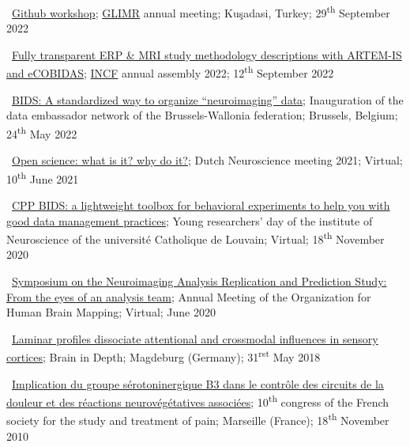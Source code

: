 \textbullet~\href{https://docs.google.com/presentation/d/1508GI_iLxyRwzJtWmnSQuSnfuGEUCaVXHguu8FRA4dI/}{Github workshop};
\href{https://glimr.eu/}{GLIMR} annual meeting;
Kuşadasi, Turkey;
29\textsuperscript{th} September 2022

\textbullet~\href{https://docs.google.com/presentation/d/1z1aixJTiUl6plDOPEIobntSKUgspVaN6Doby5EDMubI/}
{Fully transparent ERP & MRI study methodology descriptions with ARTEM-IS and eCOBIDAS};
\href{https://www.incf.org}{INCF} annual assembly 2022;
12\textsuperscript{th} September 2022

\textbullet~\href{https://osf.io/h7gcm}{BIDS: A standardized way to organize “neuroimaging” data};
Inauguration of the data embassador network of the Brussels-Wallonia federation;
Brussels, Belgium;
24\textsuperscript{th} May 2022

\textbullet~\href{https://osf.io/ce7tn/}{Open science: what is it? why do it?};
Dutch Neuroscience meeting 2021;
Virtual;
10\textsuperscript{th} June 2021

\textbullet~\href{https://osf.io/y7cjn/}{CPP BIDS: a lightweight toolbox for behavioral experiments to help you with good data management practices};
Young researchers' day of the institute of Neuroscience of the université Catholique de Louvain;
Virtual;
18\textsuperscript{th} November 2020

\textbullet~\href{https://osf.io/b8p9e/}{Symposium on the Neuroimaging Analysis
Replication and Prediction Study: From the eyes of an analysis team};
Annual Meeting of the Organization for Human Brain Mapping;
Virtual;
June 2020

\textbullet~\href{https://osf.io/b8p9e/}{Laminar profiles dissociate attentional and crossmodal influences in sensory cortices};
Brain in Depth;
Magdeburg (Germany);
31\textsuperscript{rst} May 2018

\textbullet~\href{https://osf.io/r7gfm/}{Implication du groupe sérotoninergique B3 dans le contrôle des circuits de la douleur et des réactions neurovégétatives associées};
10\textsuperscript{th} congress of the French society for the study and treatment of pain;
Marseille (France);
18\textsuperscript{th} November 2010
